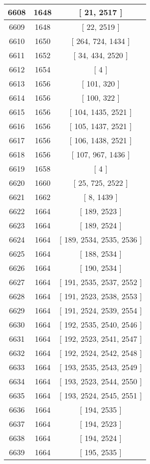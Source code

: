 \begin{center}
\begin{longtable}[H]{|| c c c ||}
\hline
6608 & 1648 & [ 21, 2517 ] \\ 
\hline
6609 & 1648 & [ 22, 2519 ] \\ 
\hline
6610 & 1650 & [ 264, 724, 1434 ] \\ 
\hline
6611 & 1652 & [ 34, 434, 2520 ] \\ 
\hline
6612 & 1654 & [ 4 ] \\ 
\hline
6613 & 1656 & [ 101, 320 ] \\ 
\hline
6614 & 1656 & [ 100, 322 ] \\ 
\hline
6615 & 1656 & [ 104, 1435, 2521 ] \\ 
\hline
6616 & 1656 & [ 105, 1437, 2521 ] \\ 
\hline
6617 & 1656 & [ 106, 1438, 2521 ] \\ 
\hline
6618 & 1656 & [ 107, 967, 1436 ] \\ 
\hline
6619 & 1658 & [ 4 ] \\ 
\hline
6620 & 1660 & [ 25, 725, 2522 ] \\ 
\hline
6621 & 1662 & [ 8, 1439 ] \\ 
\hline
6622 & 1664 & [ 189, 2523 ] \\ 
\hline
6623 & 1664 & [ 189, 2524 ] \\ 
\hline
6624 & 1664 & [ 189, 2534, 2535, 2536 ] \\ 
\hline
6625 & 1664 & [ 188, 2534 ] \\ 
\hline
6626 & 1664 & [ 190, 2534 ] \\ 
\hline
6627 & 1664 & [ 191, 2535, 2537, 2552 ] \\ 
\hline
6628 & 1664 & [ 191, 2523, 2538, 2553 ] \\ 
\hline
6629 & 1664 & [ 191, 2524, 2539, 2554 ] \\ 
\hline
6630 & 1664 & [ 192, 2535, 2540, 2546 ] \\ 
\hline
6631 & 1664 & [ 192, 2523, 2541, 2547 ] \\ 
\hline
6632 & 1664 & [ 192, 2524, 2542, 2548 ] \\ 
\hline
6633 & 1664 & [ 193, 2535, 2543, 2549 ] \\ 
\hline
6634 & 1664 & [ 193, 2523, 2544, 2550 ] \\ 
\hline
6635 & 1664 & [ 193, 2524, 2545, 2551 ] \\ 
\hline
6636 & 1664 & [ 194, 2535 ] \\ 
\hline
6637 & 1664 & [ 194, 2523 ] \\ 
\hline
6638 & 1664 & [ 194, 2524 ] \\ 
\hline
6639 & 1664 & [ 195, 2535 ] \\ 

\end{longtable}
\end{center}
